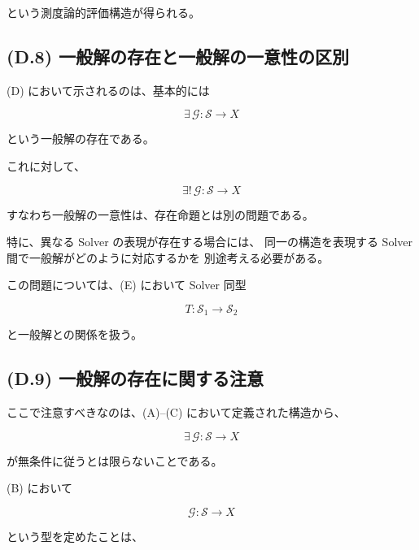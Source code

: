 \documentclass[a4paper,11pt]{article}
\newcommand{\Solver}{\mathcal{S}}
\begin{document}
という測度論的評価構造が得られる。


\subsection{(D.8) 一般解の存在と一般解の一意性の区別}
\label{subsec:D8}

(D) において示されるのは、基本的には

\begin{equation}
    \exists\,
    \mathcal{G}:
    \Solver\to X
\end{equation}

という一般解の存在である。

これに対して、

\begin{equation}
    \exists!\,
    \mathcal{G}:
    \Solver\to X
\end{equation}

すなわち一般解の一意性は、存在命題とは別の問題である。

特に、異なる Solver の表現が存在する場合には、
同一の構造を表現する Solver 間で一般解がどのように対応するかを
別途考える必要がある。

この問題については、(E) において Solver 同型

\begin{equation}
    T:
    \Solver_1
    \longrightarrow
    \Solver_2
\end{equation}

と一般解との関係を扱う。


\subsection{(D.9) 一般解の存在に関する注意}
\label{subsec:D9}

ここで注意すべきなのは、(A)--(C) において定義された構造から、

\begin{equation}
    \exists\,
    \mathcal{G}:
    \Solver\to X
\end{equation}

が無条件に従うとは限らないことである。

(B) において

\begin{equation}
    \mathcal{G}:
    \Solver\to X
\end{equation}

という型を定めたことは、
\end{document}
